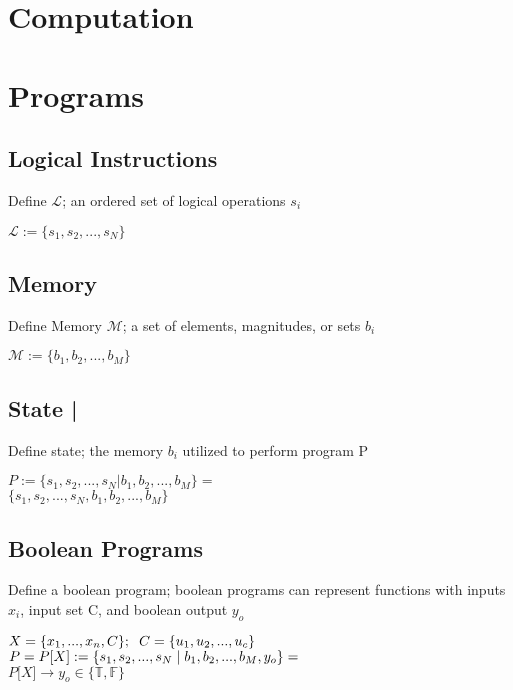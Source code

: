 \documentclass[11pt]{article}
\begin{document}
\section*{Computation}



\section{Programs}
\subsection{Logical Instructions}
Define $\mathcal{L}$; an ordered set of logical operations $s_i$
\begin{center}
$
\mathcal{L} := \{ s_1,s_2,...,s_{N}\}
$
\end{center}





\subsection{Memory}
Define Memory $\mathcal{M}$; a set of elements, magnitudes, or sets $b_i$
\begin{center}
$\mathcal{M} := \{b_1,b_2,...,b_M\}$
\end{center}




\subsection{State |}
Define state; the memory $b_i$ utilized to perform program P
\begin{center}
$
P := \{ s_1, s_2,...,s_{N} | b_1, b_2,...,b_M\} =
$
\\ \vspace{2mm}
$
\{ s_1, s_2,...,s_{N}, b_1, b_2,...,b_M\}
$
\end{center}





\subsection{Boolean Programs}
Define a boolean program; boolean programs can represent functions with inputs $x_i$, input set C, and boolean output $y_o$
\begin{center}
$
X = \{x_1,...,x_n,C\}; \hspace{2mm} C = \{u_1,u_2,...,u_c\}
$
\\ \vspace{2mm}
$P = P\lbrack X \rbrack := \{ s_1,s_2,...,s_{N}\hspace{1mm}|\hspace{1mm} b_1, b_2,...,b_M,y_o\}=$
\\ \vspace{2mm}
$
P\lbrack X \rbrack \rightarrow y_o \in \{ \mathbb{T},\mathbb{F}\}
$
\end{center}
\end{document}
